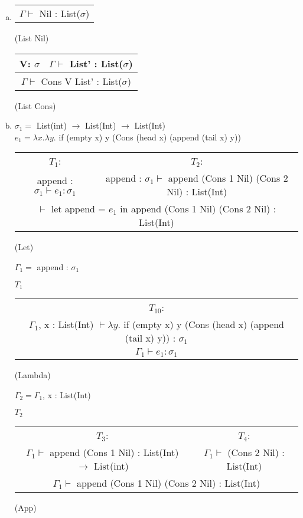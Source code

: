 \documentclass[12pt, a4paper]{article}
\begin{document}
\begin{enumerate}[(a)]
	\begin{tabular}{c}
		List$_1$ $\Downarrow$ Cons V$_1$ List$_1$'
		\\\hline
		append List$_1$ List$_2$ $\Downarrow$ Cons V$_1$ (append List$_1$' List$_2$)
	\end{tabular}
	(append Cons)

	Apparently this was not what we were supposed to do, we were supposed to define a lambda function:

	let append = $\lambda x. \lambda y.$ if (empty x) y (Cons (head x) (append (tail x) y))
	in append (Cons 1 Nil) (Cons 2 Nil)
	\item %
	\begin{tabular}{c}
		\\\hline
		$\Gamma \vdash$ Nil : List($\sigma$)
	\end{tabular}
	(List Nil)

	\begin{tabular}{c c}
		V: $\sigma$ & $\Gamma \vdash$ List' : List($\sigma$)
		\\\hline
		\multicolumn{2}{c}{$\Gamma \vdash$ Cons V List' : List($\sigma$)}
	\end{tabular}
	(List Cons)
	\item %
	$\sigma_1 =$ List(int) $\rightarrow$ List(Int) $\rightarrow$ List(Int)\\
	$e_1 = \lambda x. \lambda y.$ if (empty x) y (Cons (head x) (append (tail x) y))

	\begin{tabular}{c c}
		$T_1$: & $T_2$:\\
		append : $\sigma_1 \vdash e_1 : \sigma_1$ & append : $\sigma_1 \vdash$ append (Cons 1 Nil) (Cons 2 Nil) : List(Int)
		\\\hline
		\multicolumn{2}{c}{$\vdash$ let append = $e_1$ in append (Cons 1 Nil) (Cons 2 Nil) : List(Int)}
	\end{tabular}
	(Let)

	$\Gamma_1 =$ append : $\sigma_1$

	$T_1$
	\begin{tabular}{c}
		$T_{10}$:\\
		$\Gamma_1$, x : List(Int) $\vdash \lambda y.$ if (empty x) y (Cons (head x) (append (tail x) y)) : $\sigma_1$
		\\\hline
		$\Gamma_1 \vdash e_1 : \sigma_1$
	\end{tabular}
	(Lambda)

	$\Gamma_2 = \Gamma_1$, x : List(Int)

	$T_2$
	\begin{tabular}{c c}
		$T_3$: & $T_4$:\\
		$\Gamma_1 \vdash$ append (Cons 1 Nil) : List(Int) $\rightarrow$ List(int) & $\Gamma_1 \vdash$ (Cons 2 Nil) : List(Int)
		\\\hline
		\multicolumn{2}{c}{$\Gamma_1 \vdash$ append (Cons 1 Nil) (Cons 2 Nil) : List(Int)}
	\end{tabular}
	(App)


\end{enumerate}
\end{document}
